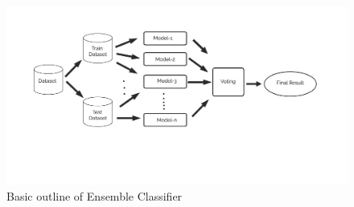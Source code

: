 \begin{figure}[H]
    \centering
    \includegraphics[width=160mm]{./img/ensemble.jpg}
    \caption{Basic outline of Ensemble Classifier}
\end{figure}

